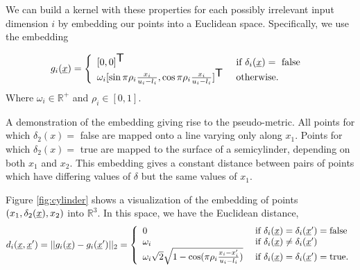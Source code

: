 \documentclass[landscape,a0b,final,a4resizeable]{include/a0poster}
\newcommand{\vect}[1]{\underline{\smash{#1}}}
\renewcommand{\v}[1]{\vect{#1}}
\newcommand{\reals}{\mathds{R}}
\newcommand{\sX}{\mathcal{X}}
\newcommand{\br}{}%
\newcommand\transpose{{\textrm{\tiny{\sf{T}}}}}
\newcommand{\embeddingletter}{g}
\begin{document}
\begin{poster}
\begin{multicols}{3}
\newpage 
{}

We can build a kernel with these properties for each possibly irrelevant input dimension $i$ by embedding our points into a Euclidean space.  Specifically, we use the embedding
%
%
%

\begin{equation}
\embeddingletter_i\br(\v{x}) = \left\{\begin{array}{ll}
[0,0]^\transpose & \textrm{ if } \delta_i(\v{x}) = \textrm{ false }\\
\omega_i [\sin{\pi\rho_i\frac{x_i}{u_i-l_i}}, \cos{\pi\rho_i\frac{x_i}{u_i-l_i}}]^\transpose & \textrm{ otherwise.}\end{array}\right.
\label{eq:embedding}
\end{equation}
Where $\omega_i \in \mathbb{R}^+$ and $\rho_i \in [0,1]$.
%


\centering
\label{fig:cylinder}

A demonstration of the embedding giving rise to the pseudo-metric.  All points for which $\delta_2(x) =$ false are mapped onto a line varying only along $x_1$.  Points for which $\delta_2(x) =$ true are mapped to the surface of a semicylinder, depending on both $x_1$ and $x_2$.  This embedding gives a constant distance between pairs of points which have differing values of $\delta$ but the same values of $x_1$.


Figure \ref{fig:cylinder} shows a visualization of the embedding of points $(x_1, \delta_2(\v{x}), x_2)$ into $\reals^3$. 
%
In this space, we have the Euclidean distance,
%
\begin{equation}
d\br_i(\v{x}, \v{x}') = ||\embeddingletter_i\br(\v{x})-\embeddingletter_i\br(\v{x}')||_2 =\left\{\begin{array}{ll}
0 & \textrm{ if } \delta_i(\v{x}) = \delta_i(\v{x}') = \textrm{false}\\
\omega_i & \textrm{ if } \delta_i(\v{x}) \neq \delta_i(\v{x}')\\
\omega_i \sqrt{2} \sqrt{1 - \cos(\pi\rho_i \frac{x_i-x_i'}{u_i-l_i})} & \textrm{ if } \delta_i(\v{x}) = \delta_i(\v{x}') = \textrm{true}. \end{array}\right.
\label{eq:distance}
\end{equation}


\end{multicols}
\end{poster}
\end{document}
